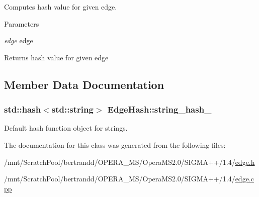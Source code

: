Computes hash value for given edge. 
\begin{DoxyParams}{Parameters}
\item[{\em edge}]edge \end{DoxyParams}
\begin{DoxyReturn}{Returns}
hash value for given edge 
\end{DoxyReturn}


\subsection{Member Data Documentation}
\hypertarget{classEdgeHash_ad792d3023aeb1aa2b561e6b3a777f992}{
\subsubsection[{string\_\-hash\_\-}]{\setlength{\rightskip}{0pt plus 5cm}std::hash$<$std::string$>$ {\bf EdgeHash::string\_\-hash\_\-}}}
\label{classEdgeHash_ad792d3023aeb1aa2b561e6b3a777f992}
Default hash function object for strings. 

The documentation for this class was generated from the following files:\begin{DoxyCompactItemize}
\item 
/mnt/ScratchPool/bertrandd/OPERA\_\-MS/OperaMS2.0/SIGMA++/1.4/\hyperlink{edge_8h}{edge.h}\item 
/mnt/ScratchPool/bertrandd/OPERA\_\-MS/OperaMS2.0/SIGMA++/1.4/\hyperlink{edge_8cpp}{edge.cpp}\end{DoxyCompactItemize}
